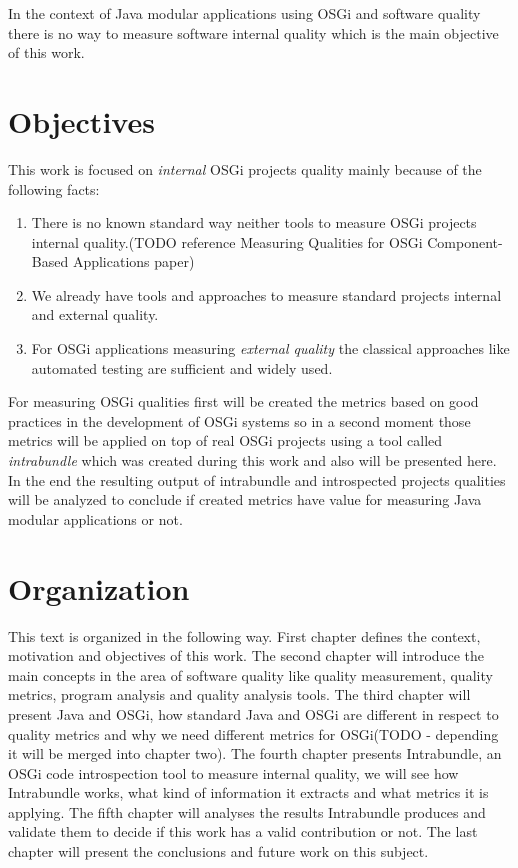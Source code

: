 In the context of Java modular applications using OSGi and software quality there is no way to measure software internal quality which is the main objective of this work.          


\section{Objectives}

This work is focused on \emph{internal} OSGi projects quality mainly because of the following facts:
\begin{enumerate}
  \item There is no known standard way neither tools to measure OSGi projects internal quality.(TODO reference Measuring Qualities for OSGi Component-Based Applications paper)
  \item We already have tools and approaches to measure standard projects internal and external quality.
  \item For OSGi applications measuring \emph{external quality} the classical approaches like automated testing are sufficient and widely used.
\end{enumerate}
For measuring OSGi qualities first will be created the metrics based on good practices in the development of OSGi systems so in a second moment those metrics will be applied on top of real OSGi projects using a tool called \emph{intrabundle} which was created during this work and also will be presented here. In the end the resulting output of intrabundle and introspected projects qualities will be analyzed to conclude if created metrics have value for measuring Java modular applications or not.  

 
\section{Organization}

This text is organized in the following way. First chapter defines the context, motivation and objectives of this work. The second chapter will introduce the main concepts in the area of software quality like quality measurement, quality metrics, program analysis and quality analysis tools. The third chapter will present Java and OSGi, how standard Java and OSGi are different in respect to quality metrics and why we need different metrics for OSGi(TODO - depending it will be merged into chapter two). The fourth chapter presents Intrabundle, an OSGi code introspection tool to measure internal quality, we will see how Intrabundle works, what kind of information it extracts and what metrics it is applying. The fifth chapter will analyses the results Intrabundle produces and validate them to decide if this work has a valid contribution or not. The last chapter will present the conclusions and future work on this subject. 
   
 